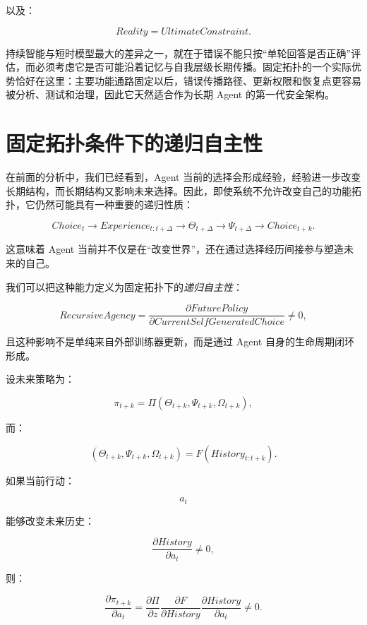 \begin{statementbox}
\centering
{}
\end{statementbox}

以及：

\[
\boxed{
Reality
=
UltimateConstraint.
}
\]

持续智能与短时模型最大的差异之一，就在于错误不能只按“单轮回答是否正确”评估，而必须考虑它是否可能沿着记忆与自我层级长期传播。固定拓扑的一个实际优势恰好在这里：主要功能通路固定以后，错误传播路径、更新权限和恢复点更容易被分析、测试和治理，因此它天然适合作为长期 Agent 的第一代安全架构。

\section{固定拓扑条件下的递归自主性}

在前面的分析中，我们已经看到，Agent 当前的选择会形成经验，经验进一步改变长期结构，而长期结构又影响未来选择。因此，即使系统不允许改变自己的功能拓扑，它仍然可能具有一种重要的递归性质：

\[
Choice_t
\rightarrow
Experience_{t:t+\Delta}
\rightarrow
\Theta_{t+\Delta}
\rightarrow
\Psi_{t+\Delta}
\rightarrow
Choice_{t+k}.
\]

这意味着 Agent 当前并不仅是在“改变世界”，还在通过选择经历间接参与塑造未来的自己。

我们可以把这种能力定义为固定拓扑下的\emph{递归自主性}：

\[
\boxed{
RecursiveAgency
=
\frac{\partial FuturePolicy}
{\partial CurrentSelfGeneratedChoice}
\neq0,
}
\]

且这种影响不是单纯来自外部训练器更新，而是通过 Agent 自身的生命周期闭环形成。

设未来策略为：

\[
\pi_{t+k}
=
\Pi
(
\Theta_{t+k},
\Psi_{t+k},
\Omega_{t+k}
),
\]

而：

\[
(\Theta_{t+k},\Psi_{t+k},\Omega_{t+k})
=
F
(
History_{t:t+k}
).
\]

如果当前行动：

\[
a_t
\]

能够改变未来历史：

\[
\frac{\partial History}{\partial a_t}
\neq0,
\]

则：

\[
\frac{\partial \pi_{t+k}}
{\partial a_t}
=
\frac{\partial \Pi}{\partial z}
\frac{\partial F}{\partial History}
\frac{\partial History}{\partial a_t}
\neq0.
\]

